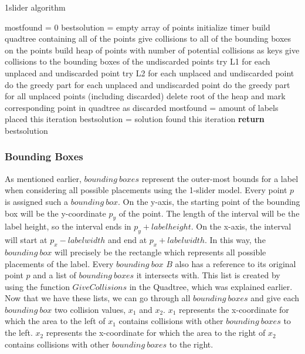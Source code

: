 \documentclass[crop=false,a4paper,oneside,11pt]{article}
\begin{document}
 \begin{algorithm}[H]
\caption{1slider algorithm}
\begin{algorithmic}[1]
\State mostfound = 0
\State bestsolution = empty array of points
\State initialize timer
\State build quadtree containing all of the points
\State give collisions to all of the bounding boxes on the points
\State build heap of points with number of potential collisions as keys
\State give collisions to the bounding boxes of the undiscarded points
\State try L1 for each unplaced and undiscarded point
\State try L2 for each unplaced and undiscarded point
\State do the greedy part for each unplaced and undiscarded point
\State do the greedy part for all unplaced points (including discarded)
\State delete root of the heap and mark corresponding point in quadtree as discarded
\State mostfound = amount of labels placed this iteration
\State bestsolution = solution found this iteration
\EndIf
\EndWhile
\State \textbf{return} bestsolution
\EndProcedure
\end{algorithmic}
\end{algorithm}
\subsubsection{Bounding Boxes}
As mentioned earlier, $bounding \ boxes$ represent the outer-most bounds for a label when considering all possible placements using the 1-slider model. Every point $p$ is assigned such a $bounding \ box$. On the y-axis, the starting point of the bounding box will be the y-coordinate $p_y$ of the point. The length of the interval will be the label height, so the interval ends in $p_y + labelheight$. On the x-axis, the interval will start at $p_x - labelwidth$ and end at $p_x+labelwidth$. In this way, the $bounding \ box$ will precisely be the rectangle which represents all possible placements of the label. Every $bounding \ box$ $B$ also has a reference to its original point $p$ and a list of $bounding \ boxes$ it intersects with. This list is created by using the function $GiveCollisions$ in the Quadtree, which was explained earlier. Now that we have these lists, we can go through all $bounding \ boxes$ and give each $bounding \ box$ two collision values, $x_1$ and $x_2$. $x_1$ represents the x-coordinate for which the area to the left of $x_1$ contains collisions with other $bounding \ boxes$ to the left. $x_2$ represents the x-coordinate for which the area to the right of $x_2$ contains collisions with other $bounding \ boxes$ to the right. 
\end{document}
